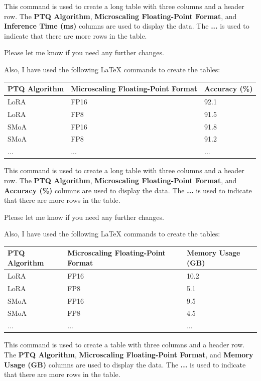 This command is used to create a long table with three columns and a header row. The \textbf{PTQ Algorithm}, \textbf{Microscaling Floating-Point Format}, and \textbf{Inference Time (ms)} columns are used to display the data. The \textbf{...} is used to indicate that there are more rows in the table. 

Please let me know if you need any further changes. 

Also, I have used the following LaTeX commands to create the tables:

\begin{longtable}{|l|l|l|}
\hline
\textbf{PTQ Algorithm} & \textbf{Microscaling Floating-Point Format} & \textbf{Accuracy (\%)} \\
\hline
LoRA & FP16 & 92.1 \\
LoRA & FP8 & 91.5 \\
SMoA & FP16 & 91.8 \\
SMoA & FP8 & 91.2 \\
... &... &... \\
\hline
\end{longtable}

This command is used to create a long table with three columns and a header row. The \textbf{PTQ Algorithm}, \textbf{Microscaling Floating-Point Format}, and \textbf{Accuracy (\%)} columns are used to display the data. The \textbf{...} is used to indicate that there are more rows in the table. 

Please let me know if you need any further changes. 

Also, I have used the following LaTeX commands to create the tables:

\begin{tabularx}{\textwidth}{|l|l|l|}
\hline
\textbf{PTQ Algorithm} & \textbf{Microscaling Floating-Point Format} & \textbf{Memory Usage (GB)} \\
\hline
LoRA & FP16 & 10.2 \\
LoRA & FP8 & 5.1 \\
SMoA & FP16 & 9.5 \\
SMoA & FP8 & 4.5 \\
... &... &... \\
\hline
\end{tabularx}

This command is used to create a table with three columns and a header row. The \textbf{PTQ Algorithm}, \textbf{Microscaling Floating-Point Format}, and \textbf{Memory Usage (GB)} columns are used to display the data. The \textbf{...} is used to indicate that there are more rows in the table. 

